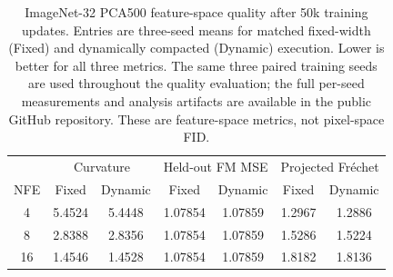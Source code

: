 \begin{table}[t]
\centering
\caption{ImageNet-32 PCA500 feature-space quality after 50k training updates.
Entries are three-seed means for matched fixed-width (Fixed) and dynamically
compacted (Dynamic) execution. Lower is better for all three metrics. The
same three paired training seeds are used throughout the quality evaluation;
the full per-seed measurements and analysis artifacts are available in the
public GitHub repository. These are feature-space metrics, not pixel-space
FID.}
\label{tab:imagenet-quality}
\small
\begin{tabular}{@{}c cc cc cc@{}}
\toprule
& \multicolumn{2}{c}{Curvature} & \multicolumn{2}{c}{Held-out FM MSE} & \multicolumn{2}{c}{Projected Fr\'echet} \\
NFE & Fixed & Dynamic & Fixed & Dynamic & Fixed & Dynamic \\
\midrule
4  & 5.4524 & 5.4448 & 1.07854 & 1.07859 & 1.2967 & 1.2886 \\
8  & 2.8388 & 2.8356 & 1.07854 & 1.07859 & 1.5286 & 1.5224 \\
16 & 1.4546 & 1.4528 & 1.07854 & 1.07859 & 1.8182 & 1.8136 \\
\bottomrule
\end{tabular}
\end{table}
